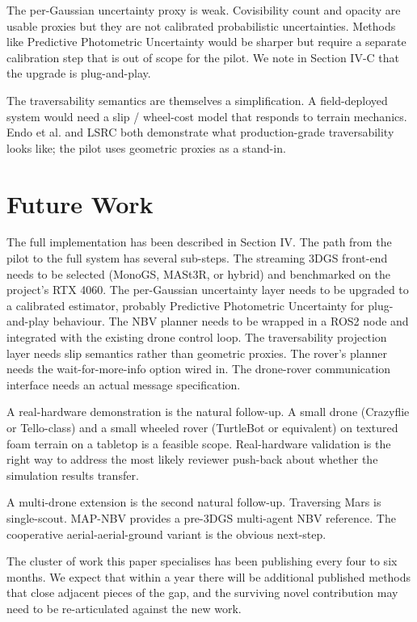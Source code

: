 \documentclass[conference]{IEEEtran}
\begin{document}
The per-Gaussian uncertainty proxy is weak. Covisibility count and opacity are usable proxies but they are not calibrated probabilistic uncertainties. Methods like Predictive Photometric Uncertainty would be sharper but require a separate calibration step that is out of scope for the pilot. We note in Section IV-C that the upgrade is plug-and-play.

The traversability semantics are themselves a simplification. A field-deployed system would need a slip / wheel-cost model that responds to terrain mechanics. Endo et al. and LSRC both demonstrate what production-grade traversability looks like; the pilot uses geometric proxies as a stand-in.

\section{Future Work}
The full implementation has been described in Section IV. The path from the pilot to the full system has several sub-steps. The streaming 3DGS front-end needs to be selected (MonoGS, MASt3R, or hybrid) and benchmarked on the project's RTX 4060. The per-Gaussian uncertainty layer needs to be upgraded to a calibrated estimator, probably Predictive Photometric Uncertainty for plug-and-play behaviour. The NBV planner needs to be wrapped in a ROS2 node and integrated with the existing drone control loop. The traversability projection layer needs slip semantics rather than geometric proxies. The rover's planner needs the wait-for-more-info option wired in. The drone-rover communication interface needs an actual message specification.

A real-hardware demonstration is the natural follow-up. A small drone (Crazyflie or Tello-class) and a small wheeled rover (TurtleBot or equivalent) on textured foam terrain on a tabletop is a feasible scope. Real-hardware validation is the right way to address the most likely reviewer push-back about whether the simulation results transfer.

A multi-drone extension is the second natural follow-up. Traversing Mars is single-scout. MAP-NBV \cite{mapnbv} provides a pre-3DGS multi-agent NBV reference. The cooperative aerial-aerial-ground variant is the obvious next-step.

The cluster of work this paper specialises has been publishing every four to six months. We expect that within a year there will be additional published methods that close adjacent pieces of the gap, and the surviving novel contribution may need to be re-articulated against the new work.
\end{document}
